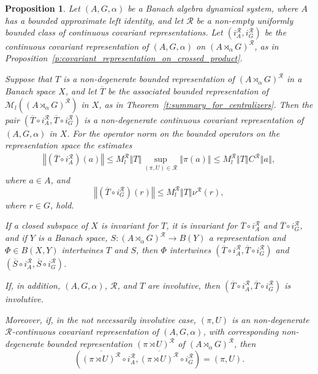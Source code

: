 \documentclass{amsart}
\theoremstyle{plain}
\newtheorem{prop}[theorem]{Proposition}
\theoremstyle{definition}
\numberwithin{equation}{section}
\begin{document}
\begin{prop}\label{p:from_crossed_product_to_dyn_sys}
Let ${(A,G,\alpha)}$ be a Banach algebra dynamical system, where $A$ has a bounded approximate left identity, and let ${\mathcal R}$ be a non-empty uniformly bounded class of continuous covariant representations. Let $(i_A^{\mathcal R}, i_G^{\mathcal R})$ be the continuous covariant representation of ${(A,G,\alpha)}$ on ${(A {\rtimes}_\alpha G)^\mathcal{R}}$, as in Proposition~\ref{p:covariant_representation_on_crossed_product}.

Suppose that $T$ is a non-degenerate bounded representation of ${(A {\rtimes}_\alpha G)^\mathcal{R}}$ in a Banach space $X$, and let $\overline T$ be the associated bounded representation of $\mathcal M_l({(A {\rtimes}_\alpha G)^\mathcal{R}})$ in $X$, as in Theorem~\ref{t:summary_for_centralizers}. Then the pair $(\overline{T} \circ i_A^{\mathcal R}, \overline{T} \circ i_G^{\mathcal R})$ is a non-degenerate continuous covariant representation of ${(A,G,\alpha)}$ in $X$.
For the operator norm on the bounded operators on the representation space the estimates
\begin{align*}
{\left\Vert {\left(\overline{T} \circ i_A^{\mathcal R}\right)(a)} \right\Vert} \leq M_l^{\mathcal R} {\left\Vert {T} \right\Vert} \sup_{{(\pi,U)}\in {\mathcal R}} {\left\Vert {\pi(a)} \right\Vert} \leq M_l^{\mathcal R} {\left\Vert {T} \right\Vert} {{C^{\mathcal R}}} {\left\Vert {a} \right\Vert},
\end{align*}
where $a \in A$, and
\begin{equation*}
{\left\Vert {\left(\overline{T} \circ i_G^{\mathcal R}\right)(r)} \right\Vert} \leq M_l^{\mathcal R} {\left\Vert {T} \right\Vert}  {\nu^{\mathcal R}}(r),
\end{equation*}
where $r\in G$, hold.

If a closed subspace of $X$ is invariant for $T$, it is invariant for $\overline{T} \circ i_A^{\mathcal R}$ and $\overline{T} \circ i_G^{\mathcal R}$, and if $Y$ is a Banach space, $S: {(A {\rtimes}_\alpha G)^\mathcal{R}} \to B(Y)$ a representation and $\Phi \in B(X,Y)$ intertwines $T$ and $S$, then $\Phi$ intertwines $(\overline{T} \circ i_A^{\mathcal R}, \overline{T} \circ i_G^{\mathcal R})$ and $(\overline{S} \circ i_A^{\mathcal R}, \overline{S} \circ i_G^{\mathcal R})$.

If, in addition, ${(A,G,\alpha)}$, $\mathcal{R}$, and $T$ are involutive, then $(\overline{T} \circ i_A^{\mathcal R}, \overline{T} \circ i_G^{\mathcal R})$ is involutive.

Moreover, if, in the not necessarily involutive case, ${(\pi,U)}$ is an non-degenerate ${\mathcal R}$-continuous covariant representation of ${(A,G,\alpha)}$, with corresponding non-degenerate bounded representation $({\pi \rtimes U})^{\mathcal R}$ of ${(A {\rtimes}_\alpha G)^\mathcal{R}}$, then
\begin{equation}\label{e:reconstruction_formula}
\left( \overline{({\pi \rtimes U})^{\mathcal R}} \circ i_A^{\mathcal R}, \overline{({\pi \rtimes U})^{\mathcal R}} \circ i_G^{\mathcal R} \right) = (\pi,U).
\end{equation}
\end{prop}
\end{document}
